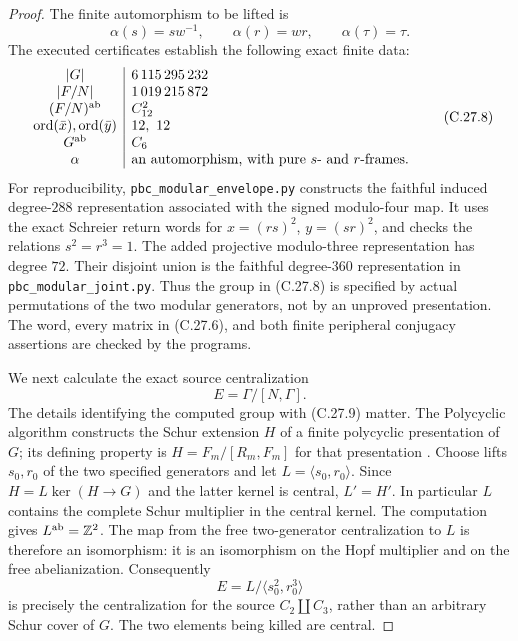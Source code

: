 \begin{proof}
The finite automorphism to be lifted is
\[
              \alpha(s)=s w^{-1},\qquad
              \alpha(r)=w r,\qquad \alpha(\tau)=\tau.
 \tag{C.27.7}
\]
The executed certificates establish the following exact finite
data:
\[
\begin{array}{c|l}
 |G|&6\,115\,295\,232\\
 |F/N|&1\,019\,215\,872\\
 (F/N)^{\rm ab}&C_{12}^2\\
 \operatorname{ord}(\bar x),\operatorname{ord}(\bar y)&12,\ 12\\
 G^{\rm ab}&C_6\\
 \alpha&\text{an automorphism, with pure }s\text{- and }r\text{-frames}.
\end{array}
 \tag{C.27.8}
\]
For reproducibility, \texttt{pbc\_modular\_envelope.py} constructs
the faithful induced degree-$288$ representation associated with
the signed modulo-four map. It uses the exact Schreier return
words for $x=(rs)^2$, $y=(sr)^2$, and checks the relations
$s^2=r^3=1$. The added projective modulo-three representation
has degree $72$. Their disjoint union is the faithful
degree-$360$ representation in \texttt{pbc\_modular\_joint.py}.
Thus the group in (C.27.8) is specified by actual permutations
of the two modular generators, not by an unproved presentation.
The word, every matrix in (C.27.6), and both finite peripheral
conjugacy assertions are checked by the programs.

We next calculate the exact source centralization
\[
                  E=\Gamma/[N,\Gamma].
 \tag{C.27.9}
\]
The details identifying the computed group with (C.27.9) matter.
The Polycyclic algorithm constructs the Schur extension $H$
of a finite polycyclic presentation of $G$; its defining
property is $H=F_m/[R_m,F_m]$ for that presentation
\cite[\S7.9-1 and \S7.9-2]{PBC_Polycyclic2026}.
Choose lifts $s_0,r_0$ of the two specified generators and let
$L=\langle s_0,r_0\rangle$. Since $H=L\ker(H\to G)$ and
the latter kernel is central, $L'=H'$. In particular $L$
contains the complete Schur multiplier in the central kernel.
The computation gives $L^{\rm ab}=\mathbb Z^2$.
The map from the free two-generator centralization to $L$
is therefore an isomorphism: it is an isomorphism on the
Hopf multiplier and on the free abelianization. Consequently
\[
                   E=L/\langle s_0^2,r_0^3\rangle
 \tag{C.27.10}
\]
is precisely the centralization for the source
$C_2\amalg C_3$, rather than an arbitrary Schur cover of $G$.
The two elements being killed are central.


\end{proof}
